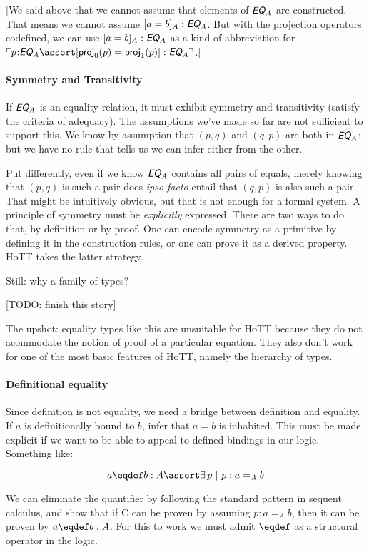 \documentclass{article}
\begin{document}
[We said above that we cannot assume that elements of \(\EQ_A\) are
  constructed. That means we cannot assume \([a=b]_A:\EQ_A\). But with
  the projection operators codefined, we can use \([a=b]_A:\EQ_A\) as
  a kind of abbreviation for \(\ulcorner p\type \EQ_A\linfer
  [\textsf{proj}_0(p) = \textsf{proj}_1(p)]:\EQ_A\urcorner\).]

\paragraph{Symmetry and Transitivity}
If \(\EQ_A\) is an equality relation, it must exhibit symmetry and
transitivity (satisfy the criteria of adequacy). The assumptions we've
made so far are not sufficient to support this. We know by assumption
that \((p,q)\) and \((q,p)\) are both in \(\EQ_A\); but we have no
rule that tells us we can infer either from the other.

Put differently, even if we know \(\EQ_A\) contains all pairs of
equals, merely knowing that \((p,q)\) is such a pair does \textit{ipso
  facto} entail that \((q,p)\) is also such a pair. That might be
intuitively obvious, but that is not enough for a formal system. A
principle of symmetry must be \textit{explicitly} expressed. There are
two ways to do that, by definition or by proof. One can encode
symmetry as a primitive by defining it in the construction rules, or
one can prove it as a derived property. HoTT takes the latter
strategy.

Still: why a family of types?

[TODO: finish this story]

The upshot: equality types like this are unsuitable for HoTT because
they do not acommodate the notion of proof of a particular equation.
They also don't work for one of the most basic features of HoTT,
namely the hierarchy of types.

\paragraph{Definitional equality}

Since definition is not equality, we need a bridge between definition
and equality. If \(a\) is definitionally bound to \(b\), infer that
\(a=b\) is inhabited. This must be made explicit if we want to be able
to appeal to defined bindings in our logic. Something like:

\[a\defn b:A \linfer\exists\,p\ |\ p : a=_A b\]

We can eliminate the quantifier by following the standard pattern in
sequent calculus, and show that if C can be proven by assuming
\(p:a=_A b\), then it can be proven by \(a\defn b:A\). For this to
work we must admit \(\defn\) as a structural operator in the logic.
\end{document}

